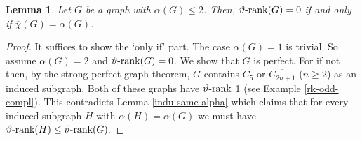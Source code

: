 \documentclass[11pt]{article}
\newcommand{\oR}{{\mathbb R}}
\newcommand{\ignore}[1]{}
\newtheorem{lemma}[theorem]{Lemma}
\newcommand{\kzeroc}{\MK^{(0)}\text{-certificate}}
\numberwithin{equation}{section}
\newcommand{\MK}{{\mathcal K}}
\newcommand{\rrank}{\vartheta\text{\rm -rank}}
\begin{document}
\begin{lemma}\label{lem-alpha-2}
Let $G$ be a graph with $\alpha(G)\le 2$. Then,
$\rrank(G)=0$ if and only if  $\overline \chi(G)=\alpha(G)$.
\end{lemma}

\begin{proof}

It suffices to show the `only if' part. The case $\alpha(G)=1$ is trivial. So assume $\alpha(G)=2$ and $\rrank(G)=0$.  We show that  $G$ is perfect.  For if not then, by the strong perfect graph theorem, $G$ contains  $C_5$ or $\overline{C_{2n+1}}$ ($n\geq 2$) as an induced subgraph. Both of these graphs have $\rrank$ 1 (see Example \ref{rk-odd-compl}). This contradicts Lemma \ref{indu-same-alpha} which claims that for every induced subgraph $H$ with $\alpha(H)=\alpha(G)$ we must have $\rrank(H)\leq \rrank(G)$.
\ignore{ and let $P$ be a $\kzeroc$ for $M_G$, i.e.,  $P\succeq 0$, $M_G\ge P$ and
$P_{ii}=\alpha(G)-1=1$ for all $i\in V$. As $P\succeq 0$ with diagonal entries equal to 1 it follows that $-1 \le P_{ij}\le 1$ for all $i,j\in V$. On the other hand, $P\le M_G$ implies $P_{ij}\le -1$ for all positions corresponding to non-edges. Therefore we have $P_{ij}=-1$ for every non-edge $\{i,j\}$.

As $P\succeq 0$ we may assume that $P$ is the Gram matrix of unit vectors $v_1,\ldots,v_n\in\oR^n$, i.e., $P=(v_i^Tv_j)_{i,j\in V}$.  Then,  for any two non-adjacent vertices $i,j$, we have  $v_i^Tv_j=-1$ and thus  $v_i=-v_j$.
Pick a unit vector $r\in\oR^n$ such that $r^Tv_i\ne 0$ for all $i\in V$ (such a vector exists since the kernel of $P$ is nontrivial by Lemma \ref{lem-kernel}).
 Define the sets $V_1=\{i\in V: r^Tv_i>0\}$ and $V_2=\{i\in V: r^Tv_i<0\}$. Then $V_1$ and $V_2$ are two cliques of $G$ that cover $V$.
 }
\end{proof}
\end{document}
